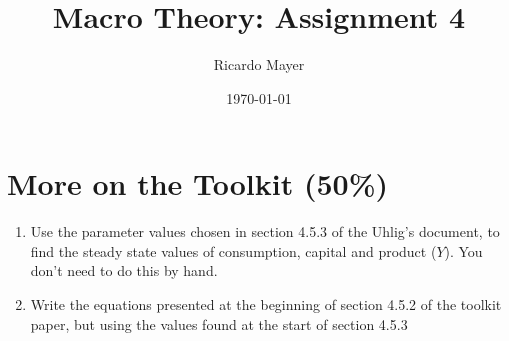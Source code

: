 \documentclass[11pt]{article}
\begin{document}
\title{Macro Theory: Assignment 4}
\author{Ricardo Mayer}
\date{\today}
\maketitle


\section{More on the Toolkit (50\%)}

\begin{enumerate}
\item Use  the parameter values chosen in section 4.5.3 of the Uhlig's document, to find the steady state values of consumption, capital and product ($Y$). You don't need to do this by hand.


\item Write the equations presented at the beginning of section 4.5.2 of the toolkit paper, but using the values found at the start of section 4.5.3



\end{enumerate}
\end{document}
